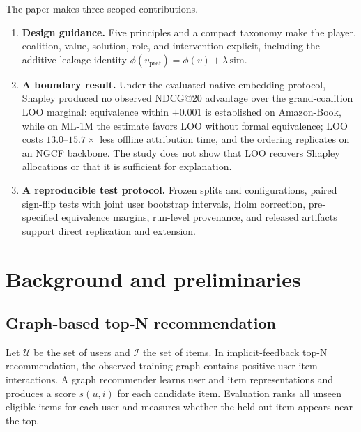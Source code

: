 \documentclass[pdflatex,sn-mathphys-num]{sn-jnl}
\begin{document}
The paper makes three scoped contributions.
\begin{enumerate}
    \item \textbf{Design guidance.} Five principles and a compact taxonomy make the player, coalition, value, solution, role, and intervention explicit, including the additive-leakage identity $\phi(v_{\mathrm{pref}})=\phi(v)+\lambda\,\mathrm{sim}$.
    \item \textbf{A boundary result.} Under the evaluated native-embedding protocol, Shapley produced no observed NDCG@20 advantage over the grand-coalition LOO marginal: equivalence within $\pm0.001$ is established on Amazon-Book, while on ML-1M the estimate favors LOO without formal equivalence; LOO costs $13.0$--$15.7\times$ less offline attribution time, and the ordering replicates on an NGCF backbone. The study does not show that LOO recovers Shapley allocations or that it is sufficient for explanation.
    \item \textbf{A reproducible test protocol.} Frozen splits and configurations, paired sign-flip tests with joint user bootstrap intervals, Holm correction, pre-specified equivalence margins, run-level provenance, and released artifacts support direct replication and extension.
\end{enumerate}

\section{Background and preliminaries}\label{sec:background}

\subsection{Graph-based top-N recommendation}\label{subsec:graph_rec}

Let $\mathcal{U}$ be the set of users and $\mathcal{I}$ the set of items. In implicit-feedback top-N recommendation, the observed training graph contains positive user-item interactions. A graph recommender learns user and item representations and produces a score $s(u,i)$ for each candidate item. Evaluation ranks all unseen eligible items for each user and measures whether the held-out item appears near the top.
\end{document}
